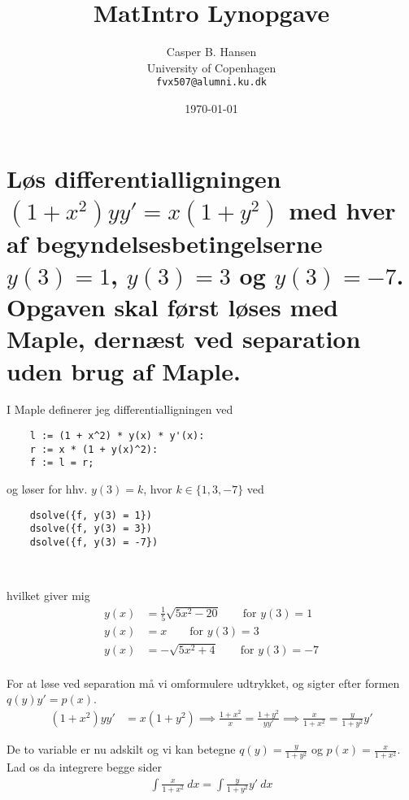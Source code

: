 \documentclass[11pt,a4paper]{article}
\title{MatIntro Lynopgave \assignmentnumber}
\author
{
    Casper B. Hansen\\
    University of Copenhagen\\
    {\tt fvx507@alumni.ku.dk}
}
\date{\today}
\newcommand{\with}[1]{{\ }d#1}
\begin{document}


\section
{
    \mdseries
    Løs differentialligningen $(1 + x^2)yy' = x(1 + y^2)$ med hver af
    begyndelsesbetingelserne $y(3) = 1$, $y(3) = 3$ og $y(3) = -7$. Opgaven
    skal først løses med Maple, dernæst ved separation uden brug af Maple.
}
\begin{multicols}{2}

    I Maple definerer jeg differentialligningen ved
    \begin{lstlisting}
    l := (1 + x^2) * y(x) * y'(x):
    r := x * (1 + y(x)^2):
    f := l = r;
    \end{lstlisting}
    og løser for hhv. $y(3) = k$, hvor $k \in \{1,3,-7\}$ ved
    \begin{lstlisting}
    dsolve({f, y(3) = 1})
    dsolve({f, y(3) = 3})
    dsolve({f, y(3) = -7})
    \end{lstlisting}

    \vfill{\ }\columnbreak

    hvilket giver mig
    \begin{align}
        y(x) &= \frac{1}{5} \sqrt{5x^2 - 20} \qquad\mbox{for $y(3) = 1$} \\
        y(x) &= x \qquad\mbox{for $y(3) = 3$} \\
        y(x) &= -\sqrt{5x^2 + 4} \qquad\mbox{for $y(3) = -7$} \\
    \end{align}

\end{multicols}

For at løse ved separation må vi omformulere udtrykket, og sigter efter
formen $q(y)y' = p(x)$.
\begin{align}
    (1 + x^2)yy' &= x(1 + y^2)
    \implies \frac{1 + x^2}{x} = \frac{1 + y^2}{yy'}
    \implies \frac{x}{1 + x^2} = \frac{y}{1 + y^2} y'
\end{align}

De to variable er nu adskilt og vi kan betegne $q(y) = \frac{y}{1 + y^2}$
og $p(x) = \frac{x}{1 + x^2}$. Lad os da integrere begge sider
\begin{align}
    \int \frac{x}{1 + x^2} \with x = \int \frac{y}{1 + y^2} y' \with x
\end{align}
\end{document}
